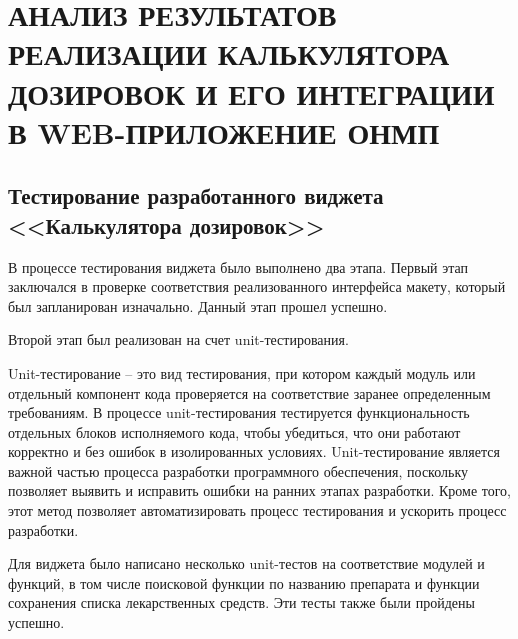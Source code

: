 \section{АНАЛИЗ РЕЗУЛЬТАТОВ РЕАЛИЗАЦИИ КАЛЬКУЛЯТОРА ДОЗИРОВОК И ЕГО ИНТЕГРАЦИИ В WEB-ПРИЛОЖЕНИЕ ОНМП}
\subsection{Тестирование разработанного виджета <<Калькулятора дозировок>>}
В процессе тестирования виджета было выполнено два этапа. Первый этап заключался в проверке соответствия реализованного интерфейса макету, который был запланирован изначально. Данный этап прошел успешно.

Второй этап был реализован на счет unit-тестирования.

Unit-тестирование -- это вид тестирования, при котором каждый модуль или отдельный компонент кода проверяется на соответствие заранее определенным требованиям. В процессе unit-тестирования тестируется функциональность отдельных блоков исполняемого кода, чтобы убедиться, что они работают корректно и без ошибок в изолированных условиях. Unit-тестирование является важной частью процесса разработки программного обеспечения, поскольку позволяет выявить и исправить ошибки на ранних этапах разработки. Кроме того, этот метод позволяет автоматизировать процесс тестирования и ускорить процесс разработки.

Для виджета было написано несколько unit-тестов на соответствие модулей и функций, в том числе поисковой функции по названию препарата и функции сохранения списка лекарственных средств. Эти тесты также были пройдены успешно.


